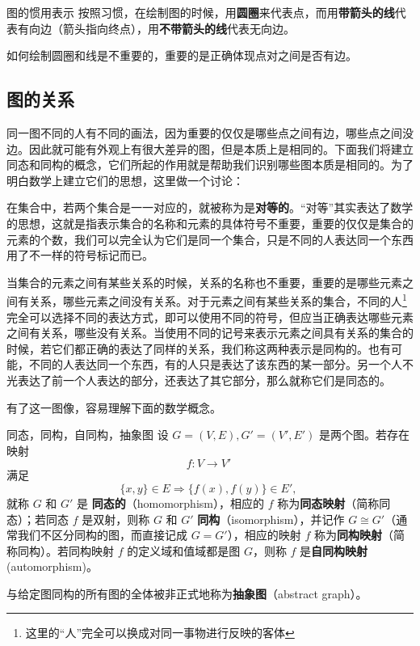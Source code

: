 \begin{definition}{图的惯用表示}
按照习惯，在绘制图的时候，用\textbf{圆圈}来代表点，而用\textbf{带箭头的线}代表有向边（箭头指向终点），用\textbf{不带箭头的线}代表无向边。
\end{definition}
如何绘制圆圈和线是不重要的，重要的是正确体现点对之间是否有边。
\subsection{图的关系}



同一图不同的人有不同的画法，因为重要的仅仅是哪些点之间有边，哪些点之间没边。因此就可能有外观上有很大差异的图，但是本质上是相同的。下面我们将建立同态和同构的概念，它们所起的作用就是帮助我们识别哪些图本质是相同的。为了明白数学上建立它们的思想，这里做一个讨论：

在集合中，若两个集合是一一对应的，就被称为是\textbf{对等的}。“对等”其实表达了数学的思想，这就是指表示集合的名称和元素的具体符号不重要，重要的仅仅是集合的元素的个数，我们可以完全认为它们是同一个集合，只是不同的人表达同一个东西用了不一样的符号标记而已。

当集合的元素之间有某些关系的时候，关系的名称也不重要，重要的是哪些元素之间有关系，哪些元素之间没有关系。对于元素之间有某些关系的集合，不同的人\footnote{这里的“人”完全可以换成对同一事物进行反映的客体}完全可以选择不同的表达方式，即可以使用不同的符号，但应当正确表达哪些元素之间有关系，哪些没有关系。当使用不同的记号来表示元素之间具有关系的集合的时候，若它们都正确的表达了同样的关系，我们称这两种表示是同构的。也有可能，不同的人表达同一个东西，有的人只是表达了该东西的某一部分。另一个人不光表达了前一个人表达的部分，还表达了其它部分，那么就称它们是同态的。

有了这一图像，容易理解下面的数学概念。
\begin{definition}{同态，同构，自同构，抽象图}
设 $G=(V,E),G'=(V',E')$ 是两个图。若存在映射
\begin{equation}
f:V\rightarrow V'~
\end{equation}
满足
\begin{equation}
\{x,y\}\in E\Rightarrow \{f(x),f(y)\}\in E',~
\end{equation}
就称 $G$ 和 $G'$ 是 \textbf{同态的}（homomorphism），相应的 $f$ 称为\textbf{同态映射}（简称同态）；若同态 $f$ 是双射，则称 $G$ 和 $G'$ \textbf{同构}（isomorphism），并记作 $G\cong G'$（通常我们不区分同构的图，而直接记成 $G=G'$），相应的映射 $f$ 称为\textbf{同构映射}（简称同构）。若同构映射 $f$ 的定义域和值域都是图 $G$，则称 $f$ 是\textbf{自同构映射}(automorphism)。

与给定图同构的所有图的全体被非正式地称为\textbf{抽象图}（abstract graph）。
\end{definition}


